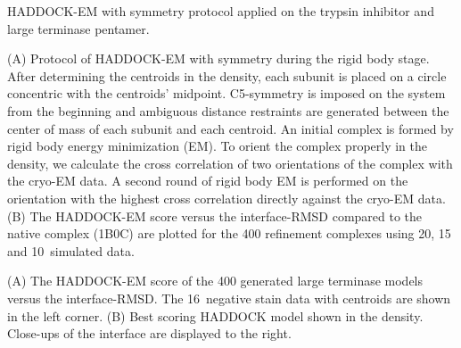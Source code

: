 \caption{HADDOCK-EM with symmetry protocol applied on the trypsin inhibitor and
large terminase pentamer.}
{(A) Protocol of HADDOCK-EM with symmetry during the rigid body stage. After
determining the centroids in the density, each subunit is placed on a circle
concentric with the centroids' midpoint. C5-symmetry is imposed on the
system from the beginning and ambiguous distance restraints are generated
between the center of mass of each subunit and each centroid. An initial complex is formed
by rigid body energy minimization (EM). To orient the complex properly in the
density, we calculate the cross correlation of two orientations of the complex
with the cryo-EM data. A second round of rigid body EM is performed on the
orientation with the highest cross correlation directly against the cryo-EM
data. 
(B) The HADDOCK-EM score versus the interface-RMSD compared to the native complex
(1B0C) are plotted for the 400 refinement complexes using 20, 15 and 10\Angstrom\
simulated data.}
\stopbuffer

\caption{}
{(A) The HADDOCK-EM score of the 400 generated large terminase models versus
the interface-RMSD. The 16\Angstrom\ negative stain data with centroids are shown
in the left corner.
(B) Best scoring HADDOCK model shown in the density. Close-ups of
the interface are displayed to the right.}
\stopbuffer

